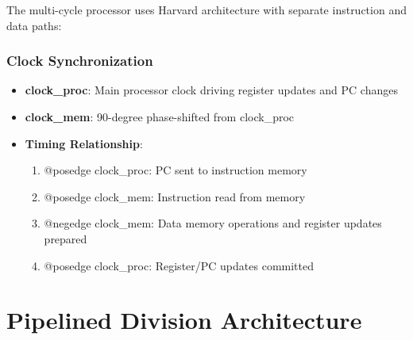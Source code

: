 \documentclass[a4paper, 11pt]{article}
\begin{document}
The multi-cycle processor uses Harvard architecture with separate instruction and data paths:

\begin{center}
\end{center}

\subsubsection{Clock Synchronization}
\begin{itemize}
    \item \textbf{clock\_proc}: Main processor clock driving register updates and PC changes
    \item \textbf{clock\_mem}: 90-degree phase-shifted from clock\_proc
    \item \textbf{Timing Relationship}:
    \begin{enumerate}
        \item @posedge clock\_proc: PC sent to instruction memory
        \item @posedge clock\_mem: Instruction read from memory
        \item @negedge clock\_mem: Data memory operations and register updates prepared
        \item @posedge clock\_proc: Register/PC updates committed
    \end{enumerate}
\end{itemize}

\newpage

\section{Pipelined Division Architecture}
\end{document}
